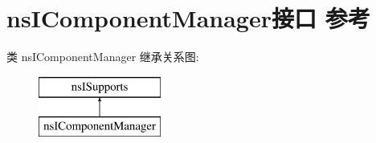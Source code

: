 \hypertarget{interfacens_i_component_manager}{}\section{ns\+I\+Component\+Manager接口 参考}
\label{interfacens_i_component_manager}
类 ns\+I\+Component\+Manager 继承关系图\+:\begin{figure}[H]
\begin{center}
\leavevmode
\includegraphics[height=2.000000cm]{interfacens_i_component_manager}
\end{center}
\end{figure}
